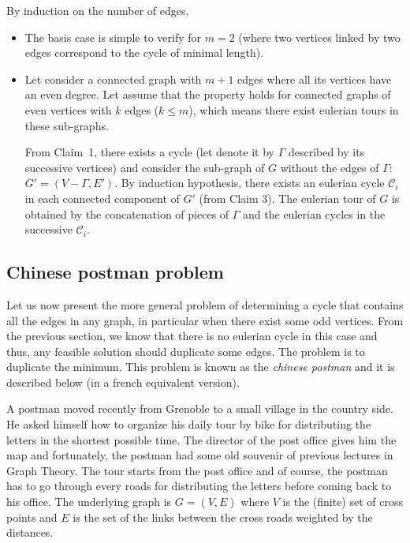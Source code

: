 By induction on the number of edges. 

\begin{itemize}
\item The basis case is simple to verify for $m=2$ (where two vertices linked by two edges correspond to the cycle of minimal length). 
\item
Let consider a connected graph with $m+1$ edges where all its vertices have an even degree.
Let assume that the property holds for connected graphs of even vertices with $k$ edges ($k \leq m$), which means there exist eulerian tours in these sub-graphs. 

From Claim~1, there exists a cycle (let denote it by $\Gamma$ described by its successive vertices) and consider the sub-graph of $G$ 
without the edges of $\Gamma$: $G'=(V-{\Gamma},E')$. 
By induction hypothesis, there exists an eulerian cycle $\mathcal{C}_i$ in each connected component of $G'$ 
(from Claim 3).
The eulerian tour of $G$ is obtained by the concatenation of pieces of $\Gamma$ and the eulerian cycles in the successive $\mathcal{C}_i$.

\end{itemize}

\subsection{Chinese postman problem}
\label{sec:chinesePostman}

Let us now present the more general problem of determining a cycle that contains all the edges in any graph, in particular when
there exist some odd vertices. From the previous section, we know that there is no eulerian cycle in this case and thus, 
any feasible solution should duplicate some edges.
The problem is to duplicate the minimum.
This problem is known as the {\it chinese postman} and it is described below (in a french equivalent version).

A postman moved recently from Grenoble to a small village in the country side. 
He asked himself how to organize his daily tour by bike for distributing the letters in the shortest possible time. 
The director of the post office gives him the map and 
fortunately, the postman had some old souvenir of previous lectures in Graph Theory.  
The tour starts from the post office and of course, the postman has to go through every roads for distributing the letters before coming back
to his office.
The underlying graph is $G=(V,E)$ where $V$ is the (finite) set of cross points and $E$ is the set of the links between the cross roads
weighted by the distances.  

